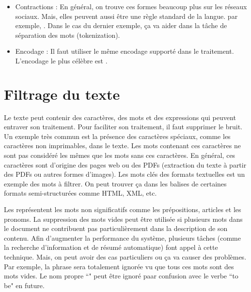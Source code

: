 \documentclass{KodeBook}
\begin{document}
\begin{itemize}
	\item Contractions : En général, on trouve ces formes beaucoup plus sur les réseaux sociaux. 
	Mais, elles peuvent aussi être une règle standard de la langue. 
	par exemple, . 
	Dans le cas du dernier exemple, ça va aider dans la tâche de séparation des mots (tokenization). 
	
	\item Encodage : Il faut utiliser le même encodage supporté dans le traitement. 
	L'encodage le plus célèbre est .

\end{itemize}


\section{Filtrage du texte}

Le texte peut contenir des caractères, des mots et des expressions qui peuvent entraver son traitement. 
Pour faciliter son traitement, il faut supprimer le bruit. 
Un exemple très commun est la présence des caractères spéciaux, comme les caractères non imprimables, dans le texte. 
Les mots contenant ces caractères ne sont pas considéré les mêmes que les mots sans ces caractères. 
En général, ces caractères sont d'origine des pages web ou des PDFs (extraction du texte à partir des PDFs ou autres formes d'images).
Les mots clés des formats textuelles est un exemple des mots à filtrer. 
On peut trouver ça dans les balises de certaines formats semi-structurées comme HTML, XML, etc.


Les  représentent les mots non significatifs comme les prépositions, articles et les pronoms.
La suppression des mots vides peut être utilisée si plusieurs mots dans le document ne contribuent pas particulièrement dans la description de son contenu.
Afin d'augmenter la performance du système, plusieurs tâches (comme la recherche d'information et de résumé automatique) font appel à cette technique.
Mais, on peut avoir des cas particuliers ou ça va causer des problèmes. 
Par exemple, la phrase  sera totalement ignorée vu que tous ces mots sont des mots vides.
Le nom propre ``" peut être ignoré paar confusion avec le verbe ``to be" en future.
\end{document}
